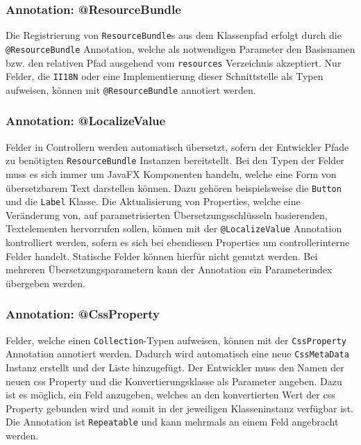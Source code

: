 \subsubsection{Annotation: @ResourceBundle}
Die Registrierung von \texttt{ResourceBundle}s aus dem Klassenpfad erfolgt durch die \texttt{@ResourceBundle} Annotation, welche als notwendigen Parameter den Basisnamen bzw. den relativen Pfad ausgehend vom \texttt{resources} Verzeichnis akzeptiert. Nur Felder, die \texttt{II18N} oder eine Implementierung dieser Schnittstelle als Typen aufweisen, können mit \texttt{@ResourceBundle} annotiert werden.
\subsubsection{Annotation: @LocalizeValue}
Felder in Controllern werden automatisch übersetzt, sofern der Entwickler Pfade zu benötigten \texttt{ResourceBundle} Instanzen bereitstellt. Bei den Typen der Felder muss es sich immer um JavaFX Komponenten handeln, welche eine Form von übersetzbarem Text darstellen können. Dazu gehören beispielsweise die \texttt{Button} und die \texttt{Label} Klasse.
Die Aktualisierung von Properties, welche eine Veränderung von, auf parametrisierten Übersetzungsschlüsseln basierenden, Textelementen hervorrufen sollen, können mit der \texttt{@LocalizeValue} Annotation kontrolliert werden, sofern es sich bei ebendiesen Properties um controllerinterne Felder handelt. Statische Felder können hierfür nicht genutzt werden. Bei mehreren Übersetzungsparametern kann der Annotation ein Parameterindex übergeben werden.
\subsubsection{Annotation: @CssProperty}
Felder, welche einen \texttt{Collection}-Typen aufweisen, können mit der \texttt{CssProperty} Annotation annotiert werden. Dadurch wird automatisch eine neue \texttt{CssMetaData} Instanz erstellt und der Liste hinzugefügt. Der Entwickler muss den Namen der neuen \ac{css} Property und die Konvertierungsklasse als Parameter angeben. Dazu ist es möglich, ein Feld anzugeben, welches an den konvertierten Wert der \ac{css} Property gebunden wird und somit in der jeweiligen Klasseninstanz verfügbar ist. Die Annotation ist \texttt{Repeatable} und kann mehrmals an einem Feld angebracht werden.
